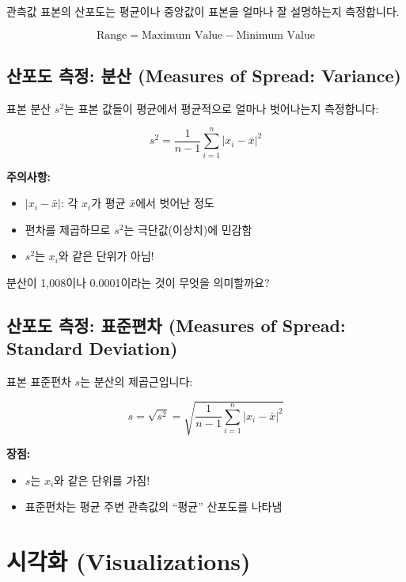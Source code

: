 \documentclass[12pt,a4paper]{article}
\begin{document}
관측값 표본의 산포도는 평균이나 중앙값이 표본을 얼마나 잘 설명하는지 측정합니다.

\begin{equation}
\text{Range} = \text{Maximum Value} - \text{Minimum Value}
\end{equation}

\subsection{산포도 측정: 분산 (Measures of Spread: Variance)}

표본 분산 $s^2$는 표본 값들이 평균에서 평균적으로 얼마나 벗어나는지 측정합니다:

\begin{equation}
s^2 = \frac{1}{n-1}\sum_{i=1}^{n}|x_i - \bar{x}|^2
\end{equation}

\textbf{주의사항:}
\begin{itemize}
    \item $|x_i - \bar{x}|$: 각 $x_i$가 평균 $\bar{x}$에서 벗어난 정도
    \item 편차를 제곱하므로 $s^2$는 극단값(이상치)에 민감함
    \item $s^2$는 $x_i$와 같은 단위가 아님!
\end{itemize}

분산이 1,008이나 0.0001이라는 것이 무엇을 의미할까요?

\subsection{산포도 측정: 표준편차 (Measures of Spread: Standard Deviation)}

표본 표준편차 $s$는 분산의 제곱근입니다:

\begin{equation}
s = \sqrt{s^2} = \sqrt{\frac{1}{n-1}\sum_{i=1}^{n}|x_i - \bar{x}|^2}
\end{equation}

\textbf{장점:}
\begin{itemize}
    \item $s$는 $x_i$와 같은 단위를 가짐!
    \item 표준편차는 평균 주변 관측값의 ``평균'' 산포도를 나타냄
\end{itemize}

\section{시각화 (Visualizations)}
\end{document}
